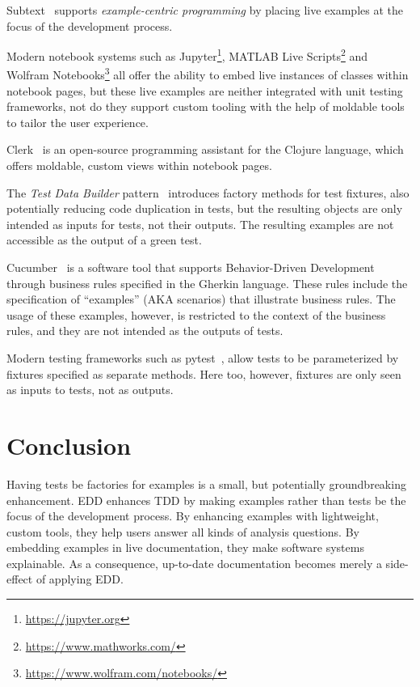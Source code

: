 \documentclass[acmsmall,screen,authorversion,nonacm]{acmart} %
\begin{document}
Subtext~\cite{Edwa04a} supports \emph{example-centric programming} by placing live examples at the focus of the development process.

Modern notebook systems such as Jupyter\footnote{\url{https://jupyter.org}}, MATLAB Live Scripts\footnote{\url{https://www.mathworks.com/}} and Wolfram Notebooks\footnote{\url{https://www.wolfram.com/notebooks/}} all offer the ability to embed live instances of classes within notebook pages, but these live examples are neither integrated with unit testing frameworks, not do they support custom tooling with the help of moldable tools to tailor the user experience.

Clerk~\cite{Kava23a} is an open-source programming assistant for the Clojure language, which offers moldable, custom views within notebook pages.


The \emph{Test Data Builder} pattern~\cite{Free09a} introduces factory methods for test fixtures, also potentially reducing code duplication in tests, but the resulting objects are only intended as inputs for tests, not their outputs.
The resulting examples are not accessible as the output of a green test.

Cucumber~\cite{Hell17a} is a software tool that supports Behavior-Driven Development through business rules specified in the Gherkin language.
These rules include the specification of ``examples'' (AKA scenarios) that illustrate business rules.
The usage of these examples, however, is restricted to the context of the business rules, and they are not intended as the outputs of tests.

Modern testing frameworks such as pytest~\cite{Okke22a}, allow tests to be parameterized by fixtures specified as separate methods.
Here too, however, fixtures are only seen as inputs to tests, not as outputs.

\section{Conclusion}\label{sec:conclusion}

Having tests be factories for examples is a small, but potentially groundbreaking enhancement.
EDD enhances TDD by making examples rather than tests be the focus of the development process.
By enhancing examples with lightweight, custom tools, they help users answer all kinds of analysis questions.
By embedding examples in live documentation, they make software systems explainable.
As a consequence, up-to-date documentation becomes merely a side-effect of applying EDD.





\end{document}
